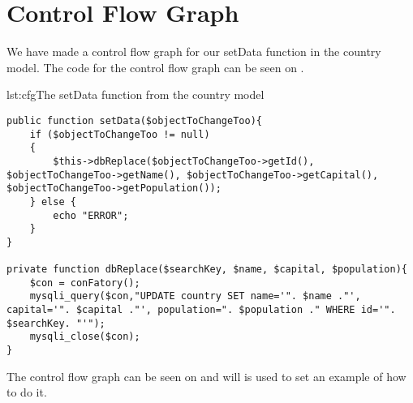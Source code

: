\section{Control Flow Graph}
We have made a control flow graph for our setData function in the country model. The code for the control flow graph can be seen on .

\begin{code}{lst:cfg}{The setData function from the country model}
\begin{lstlisting}
public function setData($objectToChangeToo){
	if ($objectToChangeToo != null)
	{	
		$this->dbReplace($objectToChangeToo->getId(), $objectToChangeToo->getName(), $objectToChangeToo->getCapital(), $objectToChangeToo->getPopulation());
	} else {
		echo "ERROR";
	}
}

private function dbReplace($searchKey, $name, $capital, $population){
	$con = conFatory();
	mysqli_query($con,"UPDATE country SET name='". $name ."', capital='". $capital ."', population=". $population ." WHERE id='". $searchKey. "'");
	mysqli_close($con);
}
\end{lstlisting}
\end{code}

The control flow graph can be seen on  and will is used to set an example of how to do it.
